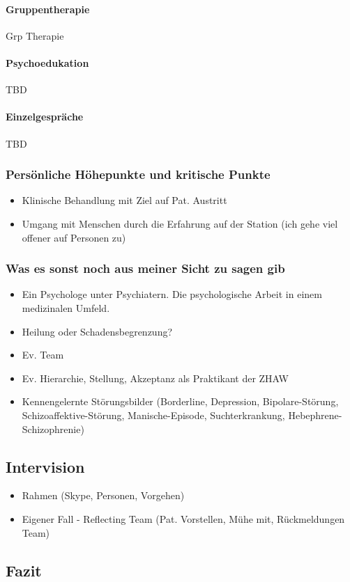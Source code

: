 \documentclass[jou,apacite]{apa6}
\begin{document}
\paragraph{Gruppentherapie}
Grp Therapie

\paragraph{Psychoedukation}
TBD

\paragraph{Einzelgespräche}
TBD

\subsubsection{Persönliche Höhepunkte und kritische Punkte}
\begin{itemize}
        
        \item Klinische Behandlung mit Ziel auf Pat. Austritt
        \item Umgang mit Menschen durch die Erfahrung auf der Station (ich gehe viel offener auf Personen zu)
\end{itemize}
    
    
\subsubsection{Was es sonst noch aus meiner Sicht zu sagen gib}
\begin{itemize}
    \item Ein Psychologe unter Psychiatern. Die psychologische Arbeit in einem medizinalen Umfeld.
    \item Heilung oder Schadensbegrenzung?
    \item Ev. Team
    \item Ev. Hierarchie, Stellung, Akzeptanz als Praktikant der ZHAW
    \item Kennengelernte Störungsbilder (Borderline, Depression, Bipolare-Störung, Schizoaffektive-Störung, Manische-Episode, Suchterkrankung, Hebephrene-Schizophrenie)
\end{itemize}

\subsection{Intervision} \label{sec:Intervision}
\begin{itemize}
    \item Rahmen (Skype, Personen, Vorgehen)
    \item Eigener Fall - Reflecting Team (Pat. Vorstellen, Mühe mit, Rückmeldungen Team)
\end{itemize}

\subsection{Fazit}


%
\end{document}
